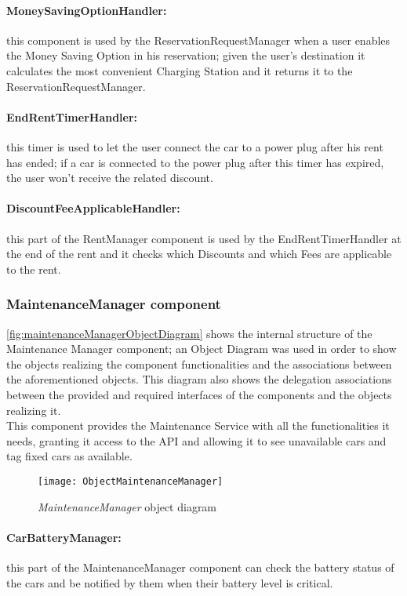 \paragraph{MoneySavingOptionHandler:} this component is used by the ReservationRequestManager when a user enables the Money Saving Option in his reservation; given the user's destination it calculates the most convenient Charging Station and it returns it to the ReservationRequestManager.
\paragraph{EndRentTimerHandler:} this timer is used to let the user connect the car to a power plug after his rent has ended; if a car is connected to the power plug after this timer has expired, the user won't receive the related discount.
\paragraph{DiscountFeeApplicableHandler:} this part of the RentManager component is used by the EndRentTimerHandler at the end of the rent and it checks which Discounts and which Fees are applicable to the rent.

\clearpage
\subsubsection{MaintenanceManager component}
\autoref{fig:maintenanceManagerObjectDiagram} shows the internal structure of the Maintenance Manager component; an Object Diagram was used in order to show the objects realizing the component functionalities and the associations between the aforementioned objects. This diagram also shows the delegation associations between the provided and required interfaces of the components and the objects realizing it.
\\
This component provides the Maintenance Service with all the functionalities it needs, granting it access to the API and allowing it to see unavailable cars and tag fixed cars as available.
\begin{figure}[h!]
	\centering
	\texttt{[image: ObjectMaintenanceManager]}
	\caption{
		\label{fig:maintenanceManagerObjectDiagram} 
		\emph{MaintenanceManager} object diagram
	}
\end{figure}

\paragraph{CarBatteryManager:} this part of the MaintenanceManager component can check the battery status of the cars and be notified by them when their battery level is critical.
